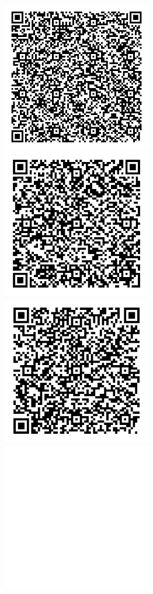 \documentclass[12pt]{article}
\begin{document}
\begin{figure}[h]
    \centering
    \includegraphics[width=65mm]{imagens/pablo.jpg}
    \includegraphics[width=65mm]{imagens/marco.jpg}
    \includegraphics[width=65mm]{imagens/lucas.jpg}
    \includegraphics[width=65mm]{imagens/blank.jpg}
\end{figure}
\end{document}
